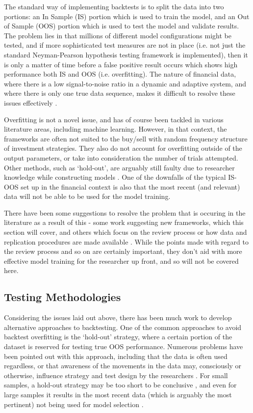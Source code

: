 \documentclass[a4paper,latin]{paper}
\begin{document}
The standard way of implementing backtests is to split the data into two portions: an In Sample (IS) portion which
 is used to train the model, and an Out of Sample (OOS) portion which is used to test the model and validate results. 
 The problem lies in that millions of different model configurations might be tested, and if more sophisticated test 
 measures are not in place (i.e. not just the standard Neyman-Pearson hypothesis testing framework is implemented), 
 then it is only a matter of time before a false positive result occurs which shows high performance both IS and OOS (i.e. overfitting). 
 The nature of financial data, where there is a low signal-to-noise ratio in a dynamic and adaptive system, and 
 where there is only one true data sequence, makes it difficult to resolve these issues effectively 
\cite{BailyPBO, McLean}.
\hfill \break 

Overfitting is not a novel issue, and has of course been tackled in various literature areas, including machine learning. 
However, in that context, the frameworks are often not suited to the buy/sell with random frequency structure of 
investment strategies. They also do not account for overfitting outside of the output parameters, or take into 
consideration the number of trials attempted. Other methods, such as ‘hold-out’, are arguably still faulty due to researcher 
knowledge while constructing models \cite{Schorfheide}. One of the downfalls of the typical IS-OOS set up in the 
financial context is also that the most recent (and relevant) data will not be able to be used for the model training. 
\hfill \break 

There have been some suggestions to resolve the problem that is occuring in the literature as a result of this - some 
work suggesting new frameworks, which this section will cover, and others which focus on the review process or 
how data and replication procedures are made available \cite{Prado}. While the points made with regard to the review process 
and so on are certainly important, they don't aid with more effective model training for the researcher up front, and 
so will not be covered here.

\subsection{Testing Methodologies}

Considering the issues laid out above, there has been much work to develop alternative approaches to backtesting. 
One of the common approaches to avoid backtest overfitting is the ‘hold-out’ strategy, where a certain portion of 
the dataset is reserved for testing true OOS performance. Numerous problems have been pointed out with this 
approach, including that the data is often used regardless, or that awareness of the movements in the data may, 
consciously or otherwise, influence strategy and test design by the researchers \cite{Schorfheide}. For small samples, 
a hold-out strategy may be too short to be conclusive \cite{Weiss}, and even for large samples it results in the 
most recent data (which is arguably the most pertinent) not being used for model selection \cite{Hawkins, BailyPBO}.
\hfill \break 
\end{document}
